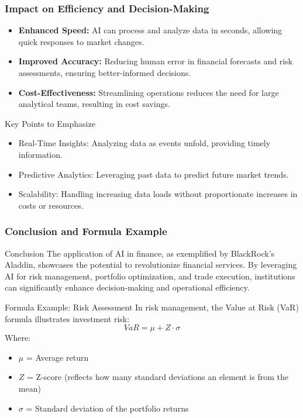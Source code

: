 \documentclass{beamer}
\begin{document}
\begin{frame}[fragile]
    \frametitle{Impact on Efficiency and Decision-Making}
    \begin{itemize}
        \item \textbf{Enhanced Speed:} 
            AI can process and analyze data in seconds, allowing quick responses to market changes.
        
        \item \textbf{Improved Accuracy:} 
            Reducing human error in financial forecasts and risk assessments, ensuring better-informed decisions.
        
        \item \textbf{Cost-Effectiveness:} 
            Streamlining operations reduces the need for large analytical teams, resulting in cost savings.
    \end{itemize}

    \begin{block}{Key Points to Emphasize}
        \begin{itemize}
            \item Real-Time Insights: Analyzing data as events unfold, providing timely information.
            \item Predictive Analytics: Leveraging past data to predict future market trends.
            \item Scalability: Handling increasing data loads without proportionate increases in costs or resources.
        \end{itemize}
    \end{block}
\end{frame}

\begin{frame}[fragile]
    \frametitle{Conclusion and Formula Example}
    \begin{block}{Conclusion}
        The application of AI in finance, as exemplified by BlackRock’s Aladdin, showcases the potential to revolutionize financial services. By leveraging AI for risk management, portfolio optimization, and trade execution, institutions can significantly enhance decision-making and operational efficiency.
    \end{block}

    \begin{block}{Formula Example: Risk Assessment}
        In risk management, the Value at Risk (VaR) formula illustrates investment risk:
        \[
        VaR = \mu + Z \cdot \sigma 
        \]
        Where:  
        \begin{itemize}
            \item \( \mu \) = Average return  
            \item \( Z \) = Z-score (reflects how many standard deviations an element is from the mean)  
            \item \( \sigma \) = Standard deviation of the portfolio returns  
        \end{itemize}
    \end{block}
\end{frame}
\end{document}
